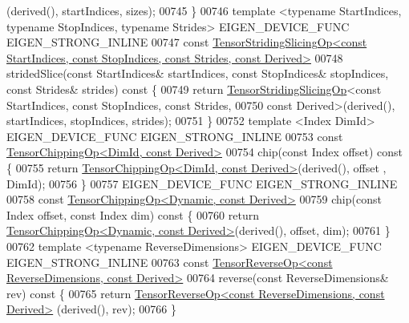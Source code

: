 \begin{DoxyCode}
      (derived(), startIndices, sizes);
00745     \}
00746     \textcolor{keyword}{template} <\textcolor{keyword}{typename} StartIndices, \textcolor{keyword}{typename} StopIndices, \textcolor{keyword}{typename} Str\textcolor{keywordtype}{id}es> EIGEN\_DEVICE\_FUNC 
      EIGEN\_STRONG\_INLINE
00747     \textcolor{keyword}{const} 
      \hyperlink{class_eigen_1_1_tensor_striding_slicing_op}{TensorStridingSlicingOp<const StartIndices, const StopIndices, const Strides, const Derived>}
00748     stridedSlice(\textcolor{keyword}{const} StartIndices& startIndices, \textcolor{keyword}{const} StopIndices& stopIndices, \textcolor{keyword}{const} Strides& strides)\textcolor{keyword}{
       const }\{
00749       \textcolor{keywordflow}{return} \hyperlink{class_eigen_1_1_tensor_striding_slicing_op}{TensorStridingSlicingOp}<\textcolor{keyword}{const} StartIndices, \textcolor{keyword}{const} StopIndices, \textcolor{keyword}{const} 
      Strides,
00750                                 \textcolor{keyword}{const} Derived>(derived(), startIndices, stopIndices, strides);
00751     \}
00752     \textcolor{keyword}{template} <Index DimId> EIGEN\_DEVICE\_FUNC EIGEN\_STRONG\_INLINE
00753     \textcolor{keyword}{const} \hyperlink{class_eigen_1_1_tensor_chipping_op}{TensorChippingOp<DimId, const Derived>}
00754     chip(\textcolor{keyword}{const} Index offset)\textcolor{keyword}{ const }\{
00755       \textcolor{keywordflow}{return} \hyperlink{class_eigen_1_1_tensor_chipping_op}{TensorChippingOp<DimId, const Derived>}(derived(), offset
      , DimId);
00756     \}
00757     EIGEN\_DEVICE\_FUNC EIGEN\_STRONG\_INLINE
00758     \textcolor{keyword}{const} \hyperlink{class_eigen_1_1_tensor_chipping_op}{TensorChippingOp<Dynamic, const Derived>}
00759     chip(\textcolor{keyword}{const} Index offset, \textcolor{keyword}{const} Index dim)\textcolor{keyword}{ const }\{
00760       \textcolor{keywordflow}{return} \hyperlink{class_eigen_1_1_tensor_chipping_op}{TensorChippingOp<Dynamic, const Derived>}(derived(), 
      offset, dim);
00761     \}
00762     \textcolor{keyword}{template} <\textcolor{keyword}{typename} ReverseDimensions> EIGEN\_DEVICE\_FUNC EIGEN\_STRONG\_INLINE
00763     \textcolor{keyword}{const} \hyperlink{class_eigen_1_1_tensor_reverse_op}{TensorReverseOp<const ReverseDimensions, const Derived>}
00764     reverse(\textcolor{keyword}{const} ReverseDimensions& rev)\textcolor{keyword}{ const }\{
00765       \textcolor{keywordflow}{return} \hyperlink{class_eigen_1_1_tensor_reverse_op}{TensorReverseOp<const ReverseDimensions, const Derived>}
      (derived(), rev);
00766     \}

\end{DoxyCode}
